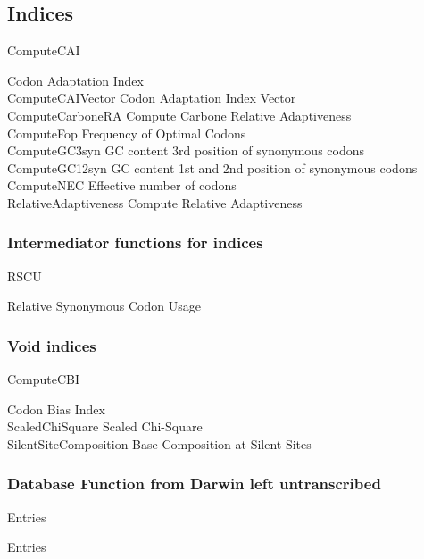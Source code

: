 \subsection{Indices}
\hypertarget{function:CAI}{ComputeCAI}	\quad Codon Adaptation Index \\
\hypertarget{function:CAIv}{ComputeCAIVector} \quad 	Codon Adaptation Index Vector \\
\hypertarget{function:RA}{ComputeCarboneRA}	\quad Compute Carbone Relative Adaptiveness \\
\hypertarget{function:Fop}{ComputeFop}	\quad Frequency of Optimal Codons \\
\hypertarget{function:G3C}{ComputeGC3syn}	\quad GC content 3rd position of synonymous codons	 \\	
\hypertarget{function:G12C}{ComputeGC12syn}	\quad GC content 1st and 2nd position of synonymous codons	 \\	
\hypertarget{function:NEC}{ComputeNEC}	\quad Effective number of codons \\							%
\hypertarget{function:RA}{RelativeAdaptiveness}	\quad Compute Relative Adaptiveness	 \\			%

\subsubsection{Intermediator functions for indices}
\hypertarget{function:RSCU}{RSCU}	Relative \quad Synonymous Codon Usage \\								%

\subsubsection{Void indices}
\hypertarget{function:CBI}{ComputeCBI}	\quad Codon Bias Index  \\
\hypertarget{function:Chi2}{ScaledChiSquare}	\quad Scaled Chi-Square  \\
\hypertarget{function:SSC}{SilentSiteComposition}	\quad Base Composition at Silent Sites  \\

\subsubsection{Database Function from Darwin left untranscribed}
\hypertarget{function:Entries}{Entries}	\quad Entries \\

